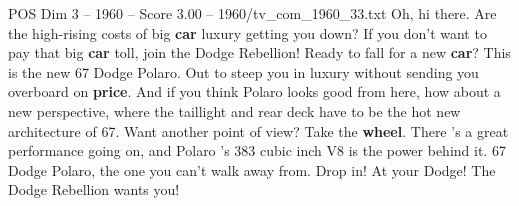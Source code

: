 \begin{textsample}{POS Dim 3 – 1960 – Score 3.00 – 1960/tv\_com\_1960\_33.txt}  \label{ex:f3_pos_029}
Oh, hi there.
Are the high-rising costs of big \textbf{car} luxury getting you down?
If you don't want to pay that big \textbf{car} toll, join the Dodge Rebellion!
Ready to fall for a new \textbf{car}?
This is the new 67 Dodge Polaro.
Out to steep you in luxury without sending you overboard on \textbf{price}.
And if you think Polaro looks good from here, how about a new perspective, where the taillight and rear deck have to be the hot new architecture of 67.
Want another point of view?
Take the \textbf{wheel}.
There 's a great performance going on, and Polaro 's 383 cubic inch V8 is the power behind it. 67 Dodge Polaro, the one you can't walk away from.
Drop in!
At your Dodge!
The Dodge Rebellion wants you!

\end{textsample}
